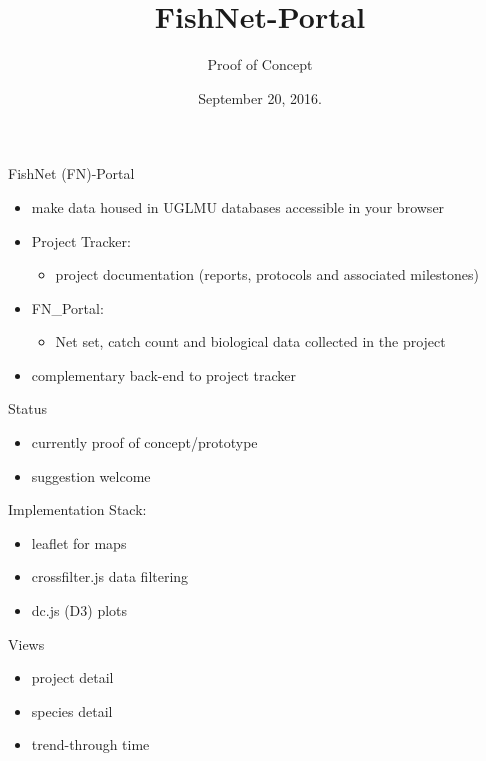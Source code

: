 \documentclass[presentation, smaller]{beamer}
\author{Proof of Concept}
\date{September 20, 2016.}
\title{FishNet-Portal}
\begin{document}
\maketitle


\begin{frame}[label=sec-1]{FishNet (FN)-Portal}
\begin{itemize}
\item make data housed in UGLMU databases accessible in your browser
\item Project Tracker:
\begin{itemize}
\item project documentation (reports, protocols and
associated milestones)
\end{itemize}
\item FN\_Portal:
\begin{itemize}
\item Net set, catch count and biological data collected in the
project
\end{itemize}
\item complementary back-end to project tracker
\end{itemize}
\end{frame}

\begin{frame}[label=sec-2]{Status}
\begin{itemize}
\item currently proof of concept/prototype
\item suggestion welcome
\end{itemize}
\end{frame}

\begin{frame}[label=sec-3]{Implementation Stack:}
\begin{itemize}
\item leaflet for maps
\item crossfilter.js data filtering
\item dc.js (D3) plots
\end{itemize}
\end{frame}

\begin{frame}[label=sec-4]{Views}
\begin{itemize}
\item project detail
\item species detail
\item trend-through time
\end{itemize}
\end{frame}
\end{document}
